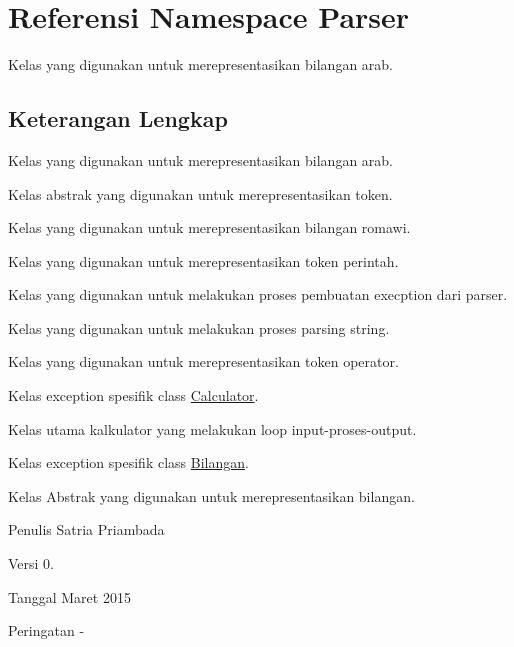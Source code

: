 \hypertarget{namespaceParser}{}\section{Referensi Namespace Parser}
\label{namespaceParser}


Kelas yang digunakan untuk merepresentasikan bilangan arab.  




\subsection{Keterangan Lengkap}
Kelas yang digunakan untuk merepresentasikan bilangan arab. 

Kelas abstrak yang digunakan untuk merepresentasikan token.

Kelas yang digunakan untuk merepresentasikan bilangan romawi.

Kelas yang digunakan untuk merepresentasikan token perintah.

Kelas yang digunakan untuk melakukan proses pembuatan execption dari parser.

Kelas yang digunakan untuk melakukan proses parsing string.

Kelas yang digunakan untuk merepresentasikan token operator.

Kelas exception spesifik class \hyperlink{classCalculator}{Calculator}.

Kelas utama kalkulator yang melakukan loop input-\/proses-\/output.

Kelas exception spesifik class \hyperlink{classBilangan}{Bilangan}.

Kelas Abstrak yang digunakan untuk merepresentasikan bilangan.

\begin{DoxyAuthor}{Penulis}
Satria Priambada 
\end{DoxyAuthor}
\begin{DoxyVersion}{Versi}
0. 
\end{DoxyVersion}
\begin{DoxyDate}{Tanggal}
Maret 2015 
\end{DoxyDate}
\begin{DoxyWarning}{Peringatan}
-\/ 
\end{DoxyWarning}
